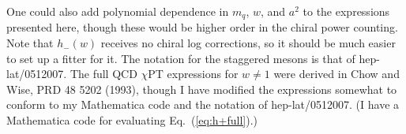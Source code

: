 \documentclass[11pt]{article}
\begin{document}
One could also add polynomial dependence in $m_q$, $w$, and $a^2$ to the expressions presented here, though these would be higher order in the chiral power counting.  Note that $h_-(w)$ receives no chiral log corrections, so it should be much easier to set up a fitter for it.  The notation for the staggered mesons is that of hep-lat/0512007.  The full QCD $\chi$PT expressions for $w\neq 1$ were derived in Chow and Wise, PRD 48 5202 (1993), though I have modified the expressions somewhat to conform to my Mathematica code and the notation of hep-lat/0512007.  (I have a Mathematica code for evaluating Eq.~(\ref{eq:h+full}).)

\begin{thebibliography}{99}


\end{thebibliography}
\end{document}
